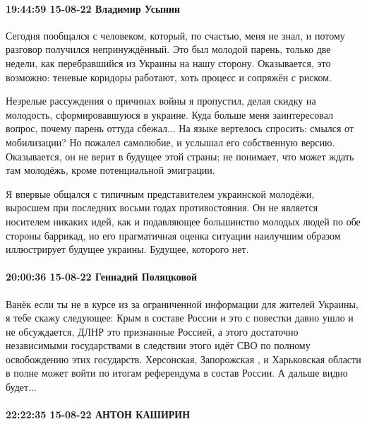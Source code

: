  
 
 
 
 

\paragraph{19:44:59 15-08-22 Владимир Усынин}

Сегодня пообщался с человеком, который, по счастью, меня не знал, и потому
разговор получился непринуждённый. Это был молодой парень, только две недели,
как перебравшийся из Украины на нашу сторону. Оказывается, это возможно:
теневые коридоры работают, хоть процесс и сопряжён с риском.

Незрелые рассуждения о причинах войны я пропустил, делая скидку на молодость,
сформировавшуюся в украине. Куда больше меня заинтересовал вопрос, почему
парень оттуда сбежал... На языке вертелось спросить: смылся от мобилизации? Но
пожалел самолюбие, и услышал его собственную версию. Оказывается, он не верит в
будущее этой страны; не понимает, что может ждать там молодёжь, кроме
потенциальной эмиграции.

Я впервые общался с типичным представителем украинской молодёжи, выросшем при
последних восьми годах противостояния. Он не является носителем никаких идей,
как и подавляющее большинство молодых людей по обе стороны баррикад, но его
прагматичная оценка ситуации наилучшим образом иллюстрирует будущее украины.
Будущее, которого нет.

\paragraph{20:00:36 15-08-22 Геннадий Поляцковой}

Ванёк если ты не в курсе из за ограниченной информации для жителей Украины, я
тебе скажу следующее: Крым в составе России и это с повестки давно ушло и не
обсуждается, ДЛНР это признанные Россией, а этого достаточно независимыми
государствами в следствии этого идёт СВО по полному освобождению этих
государств. Херсонская, Запорожская , и Харьковская области в полне может войти
по итогам референдума в состав России. А дальше видно будет...

\paragraph{22:22:35 15-08-22 АНТОН КАШИРИН}

